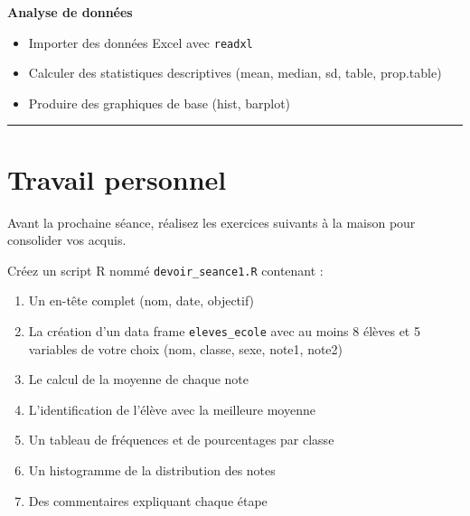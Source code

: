 \documentclass[
  french,
  11pt,
  a4paper,
]{article}
\providecommand{\tightlist}{%
  \setlength{\itemsep}{0pt}\setlength{\parskip}{0pt}}
\begin{document}
\begin{tcolorbox}
\textbf{Analyse de données}

\begin{itemize}
\tightlist
\item
  Importer des données Excel avec \texttt{readxl}
\item
  Calculer des statistiques descriptives (mean, median, sd, table,
  prop.table)
\item
  Produire des graphiques de base (hist, barplot)
\end{itemize}

\end{tcolorbox}

\begin{center}\rule{0.5\linewidth}{0.5pt}\end{center}

\section*{Travail personnel}\label{travail-personnel}

Avant la prochaine séance, réalisez les exercices suivants à la maison
pour consolider vos acquis.

\begin{tcolorbox}[enhanced jigsaw, arc=.35mm, bottomrule=.15mm, bottomtitle=1mm, breakable, colback=white, colbacktitle=quarto-callout-caution-color!10!white, colframe=quarto-callout-caution-color-frame, coltitle=black, left=2mm, leftrule=.75mm, opacityback=0, opacitybacktitle=0.6, rightrule=.15mm, title=\textcolor{quarto-callout-caution-color}{\faFire}\hspace{0.5em}{Devoir à rendre --- Exercice A : Script annoté}, titlerule=0mm, toprule=.15mm, toptitle=1mm]

Créez un script R nommé \texttt{devoir\_seance1.R} contenant :

\begin{enumerate}
\def\labelenumi{\arabic{enumi}.}
\tightlist
\item
  Un en-tête complet (nom, date, objectif)
\item
  La création d'un data frame \texttt{eleves\_ecole} avec au moins 8
  élèves et 5 variables de votre choix (nom, classe, sexe, note1, note2)
\item
  Le calcul de la moyenne de chaque note
\item
  L'identification de l'élève avec la meilleure moyenne
\item
  Un tableau de fréquences et de pourcentages par classe
\item
  Un histogramme de la distribution des notes
\item
  Des commentaires expliquant chaque étape
\end{enumerate}

\end{tcolorbox}
\end{document}
